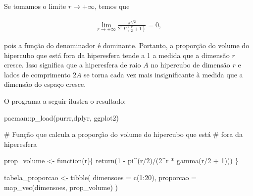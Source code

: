 \documentclass[
  a4paperpaper,
  DIV=11,
  numbers=noendperiod]{scrartcl}
\newenvironment{Shaded}{\begin{snugshade}}{\end{snugshade}}
\newcommand{\AttributeTok}[1]{\textcolor[rgb]{0.40,0.45,0.13}{#1}}
\newcommand{\CommentTok}[1]{\textcolor[rgb]{0.37,0.37,0.37}{#1}}
\newcommand{\ControlFlowTok}[1]{\textcolor[rgb]{0.00,0.23,0.31}{#1}}
\newcommand{\DecValTok}[1]{\textcolor[rgb]{0.68,0.00,0.00}{#1}}
\newcommand{\FunctionTok}[1]{\textcolor[rgb]{0.28,0.35,0.67}{#1}}
\newcommand{\NormalTok}[1]{\textcolor[rgb]{0.00,0.23,0.31}{#1}}
\newcommand{\OtherTok}[1]{\textcolor[rgb]{0.00,0.23,0.31}{#1}}
\newcommand{\SpecialCharTok}[1]{\textcolor[rgb]{0.37,0.37,0.37}{#1}}
\begin{document}
Se tomamos o limite \(r \longrightarrow +\infty\), temos que

\begin{align}
    \lim\limits_{r \longrightarrow +\infty} \frac{\pi^{r/2}}{2^r \, \Gamma\left(\frac{r}{2} + 1\right)} = 0,
\end{align}

pois a função do denominador é dominante. Portanto, a proporção do
volume do hipercubo que está fora da hiperesfera tende a 1 a medida que
a dimensão \(r\) cresce. Isso significa que a hiperesfera de raio \(A\)
no hipercubo de dimensão \(r\) e lados de comprimento \(2A\) se torna
cada vez mais insignificante à medida que a dimensão do espaço cresce.

O programa a seguir ilustra o resultado:

\begin{Shaded}
\begin{Highlighting}[]
\NormalTok{pacman}\SpecialCharTok{::}\FunctionTok{p\_load}\NormalTok{(purrr,dplyr, ggplot2)}

\CommentTok{\# Função que calcula a proporção do volume do hipercubo que está}
\CommentTok{\# fora da hiperesfera}

\NormalTok{prop\_volume }\OtherTok{\textless{}{-}} \ControlFlowTok{function}\NormalTok{(r)\{}
  \FunctionTok{return}\NormalTok{(}\DecValTok{1} \SpecialCharTok{{-}}\NormalTok{ pi}\SpecialCharTok{\^{}}\NormalTok{(r}\SpecialCharTok{/}\DecValTok{2}\NormalTok{)}\SpecialCharTok{/}\NormalTok{(}\DecValTok{2}\SpecialCharTok{\^{}}\NormalTok{r }\SpecialCharTok{*} \FunctionTok{gamma}\NormalTok{(r}\SpecialCharTok{/}\DecValTok{2} \SpecialCharTok{+} \DecValTok{1}\NormalTok{)))}
\NormalTok{\}}

\NormalTok{tabela\_proporcao }\OtherTok{\textless{}{-}} \FunctionTok{tibble}\NormalTok{(}
\AttributeTok{dimensoes =} \FunctionTok{c}\NormalTok{(}\DecValTok{1}\SpecialCharTok{:}\DecValTok{20}\NormalTok{),}
\AttributeTok{proporcao =} \FunctionTok{map\_vec}\NormalTok{(dimensoes, prop\_volume)}
\NormalTok{) }
\end{Highlighting}
\end{Shaded}
\end{document}
